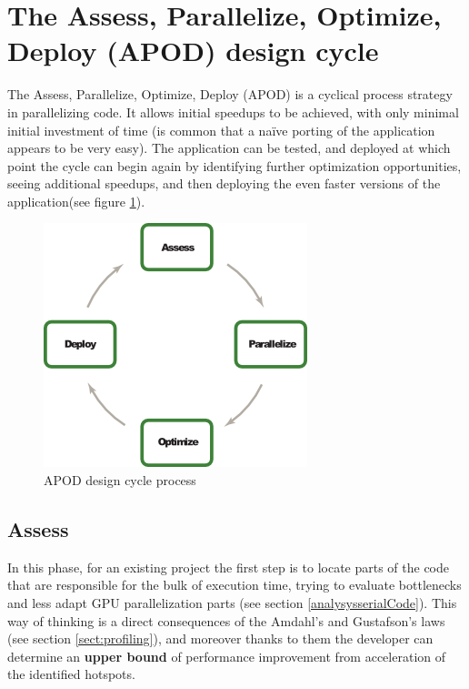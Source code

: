 



\section{The Assess, Parallelize, Optimize, Deploy (APOD) design
cycle}\label{sect:APOD}
The Assess, Parallelize, Optimize, Deploy (APOD) is a
cyclical process strategy in parallelizing code. It allows initial speedups to be achieved, with
only minimal initial investment of time (is common that a na\"{i}ve porting of the
application appears to be very easy). The application can be tested, and deployed
at which point the cycle can begin again by identifying further optimization
opportunities, seeing additional speedups, and then deploying the even faster
versions of the application(see figure \ref{fig:APOD}).


\begin{figure}
\begin{center}
\includegraphics[scale=0.85]{./images/apod-cycle}
\caption[APOD]{APOD design cycle process}
\label{fig:APOD}
\end{center}
\end{figure}

\subsection{Assess}
In this phase, for an existing project the first step is to locate parts of the
code that are responsible for the bulk of execution time, trying to evaluate
bottlenecks and less adapt GPU parallelization parts (see section
\ref{analysysserialCode}).
This way of thinking is a direct consequences of the Amdahl's and Gustafson's
laws (see section \ref{sect:profiling}), and moreover thanks to them the
developer can determine an \textbf{upper bound} of performance improvement from acceleration
of the identified hotspots.

